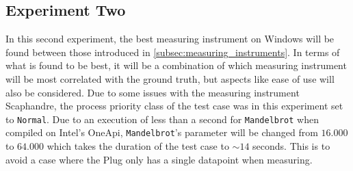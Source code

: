 \subsection{Experiment Two}\label{subsec:exp_two}

In this second experiment, the best measuring instrument on Windows will be found between those introduced in \cref{subsec:measuring_instruments}. In terms of what is found to be best, it will be a combination of which measuring instrument will be most correlated with the ground truth, but aspects like ease of use will also be considered. Due to some issues with the measuring instrument Scaphandre, the process priority class of the test case was in this experiment set to \texttt{Normal}. Due to an execution of less than a second for \texttt{Mandelbrot} when compiled on Intel's OneApi, \texttt{Mandelbrot}'s parameter will be changed from $16.000$ to $64.000$ which takes the duration of the test case to $\sim 14$ seconds. This is to avoid a case where the Plug only has a single datapoint when measuring.